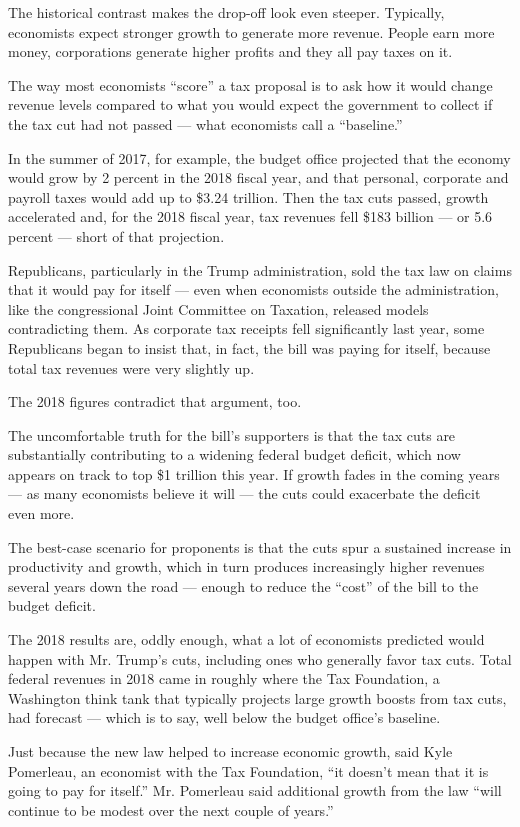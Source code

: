 The historical contrast makes the drop-off look even steeper. Typically,
economists expect stronger growth to generate more revenue. People earn
more money, corporations generate higher profits and they all pay taxes
on it.

The way most economists ``score'' a tax proposal is to ask how it would
change revenue levels compared to what you would expect the government
to collect if the tax cut had not passed --- what economists call a
``baseline.''

In the summer of 2017, for example, the budget office projected that the
economy would grow by 2 percent in the 2018 fiscal year, and that
personal, corporate and payroll taxes would add up to \$3.24 trillion.
Then the tax cuts passed, growth accelerated and, for the 2018 fiscal
year, tax revenues fell \$183 billion --- or 5.6 percent --- short of
that projection.

Republicans, particularly in the Trump administration, sold the tax law
on claims that it would pay for itself --- even when economists outside
the administration, like the congressional Joint Committee on Taxation,
released models contradicting them. As corporate tax receipts fell
significantly last year, some Republicans began to insist that, in fact,
the bill was paying for itself, because total tax revenues were very
slightly up.

The 2018 figures contradict that argument, too.

The uncomfortable truth for the bill's supporters is that the tax cuts
are substantially contributing to a widening federal budget deficit,
which now appears on track to top \$1 trillion this year. If growth
fades in the coming years --- as many economists believe it will --- the
cuts could exacerbate the deficit even more.

The best-case scenario for proponents is that the cuts spur a sustained
increase in productivity and growth, which in turn produces increasingly
higher revenues several years down the road --- enough to reduce the
``cost'' of the bill to the budget deficit.

The 2018 results are, oddly enough, what a lot of economists predicted
would happen with Mr. Trump's cuts, including ones who generally favor
tax cuts. Total federal revenues in 2018 came in roughly where the Tax
Foundation, a Washington think tank that typically projects large growth
boosts from tax cuts, had forecast --- which is to say, well below the
budget office's baseline.

Just because the new law helped to increase economic growth, said Kyle
Pomerleau, an economist with the Tax Foundation, ``it doesn't mean that
it is going to pay for itself.'' Mr. Pomerleau said additional growth
from the law ``will continue to be modest over the next couple of
years.''

